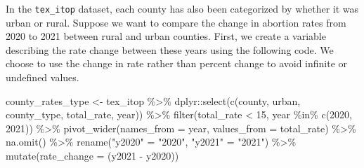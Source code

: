 \documentclass[
  letterpaper,
]{latex/krantz}
\makeatletter
\newenvironment{Shaded}{\begin{snugshade}}{\end{snugshade}}
\newcommand{\AttributeTok}[1]{\textcolor[rgb]{0.40,0.45,0.13}{#1}}
\newcommand{\CommentTok}[1]{\textcolor[rgb]{0.37,0.37,0.37}{#1}}
\newcommand{\DecValTok}[1]{\textcolor[rgb]{0.68,0.00,0.00}{#1}}
\newcommand{\FunctionTok}[1]{\textcolor[rgb]{0.28,0.35,0.67}{#1}}
\newcommand{\NormalTok}[1]{\textcolor[rgb]{0.00,0.23,0.31}{#1}}
\newcommand{\OtherTok}[1]{\textcolor[rgb]{0.00,0.23,0.31}{#1}}
\newcommand{\SpecialCharTok}[1]{\textcolor[rgb]{0.37,0.37,0.37}{#1}}
\newcommand{\StringTok}[1]{\textcolor[rgb]{0.13,0.47,0.30}{#1}}
\newenvironment{kframe}{%
\medskip{}
\setlength{\fboxsep}{.8em}
 \def\at@end@of@kframe{}%
 \ifinner\ifhmode%
  \def\at@end@of@kframe{\end{minipage}}%
  \begin{minipage}{\columnwidth}%
 \fi\fi%
 \def\FrameCommand##1{\hskip\@totalleftmargin \hskip-\fboxsep
 \colorbox{shadecolor}{##1}\hskip-\fboxsep
     \hskip-\linewidth \hskip-\@totalleftmargin \hskip\columnwidth}%
 \MakeFramed {\advance\hsize-\width
   \@totalleftmargin\z@ \linewidth\hsize
   \@setminipage}}%
 {\par\unskip\endMakeFramed%
 \at@end@of@kframe}
\renewenvironment{Shaded}{\begin{kframe}}{\end{kframe}}
\makeatother
\begin{document}
\begin{Shaded}
\end{Shaded}

In the \texttt{tex\_itop} dataset, each county has also been categorized
by whether it was urban or rural. Suppose we want to compare the change
in abortion rates from 2020 to 2021 between rural and urban counties.
First, we create a variable describing the rate change between these
years using the following code. We choose to use the change in rate
rather than percent change to avoid infinite or undefined values.

\begin{Shaded}
\begin{Highlighting}[]
\NormalTok{county\_rates\_type }\OtherTok{\textless{}{-}}\NormalTok{ tex\_itop }\SpecialCharTok{\%\textgreater{}\%}
\NormalTok{  dplyr}\SpecialCharTok{::}\FunctionTok{select}\NormalTok{(}\FunctionTok{c}\NormalTok{(county, urban, county\_type, total\_rate, year)) }\SpecialCharTok{\%\textgreater{}\%}
  \FunctionTok{filter}\NormalTok{(total\_rate }\SpecialCharTok{\textless{}} \DecValTok{15}\NormalTok{, year }\SpecialCharTok{\%in\%} \FunctionTok{c}\NormalTok{(}\DecValTok{2020}\NormalTok{, }\DecValTok{2021}\NormalTok{)) }\SpecialCharTok{\%\textgreater{}\%}
  \FunctionTok{pivot\_wider}\NormalTok{(}\AttributeTok{names\_from =}\NormalTok{ year, }\AttributeTok{values\_from =}\NormalTok{ total\_rate) }\SpecialCharTok{\%\textgreater{}\%}
  \FunctionTok{na.omit}\NormalTok{() }\SpecialCharTok{\%\textgreater{}\%}
  \FunctionTok{rename}\NormalTok{(}\StringTok{"y2020"} \OtherTok{=} \StringTok{"2020"}\NormalTok{, }\StringTok{"y2021"} \OtherTok{=} \StringTok{"2021"}\NormalTok{) }\SpecialCharTok{\%\textgreater{}\%}
  \FunctionTok{mutate}\NormalTok{(}\AttributeTok{rate\_change =}\NormalTok{ (y2021 }\SpecialCharTok{{-}}\NormalTok{ y2020)) }
\end{Highlighting}
\end{Shaded}
\end{document}
